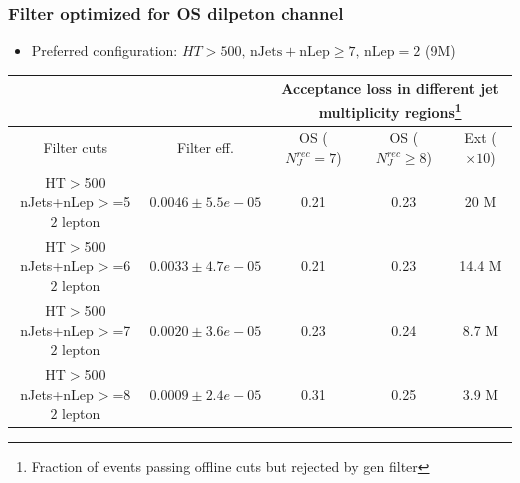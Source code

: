 \documentclass{beamer}
\begin{document}
\begin{frame}
\frametitle{Filter optimized for OS dilpeton channel}
\begin{itemize}
\item{\footnotesize  Preferred configuration: $HT>500,\, \mathrm{nJets+nLep}\geq7,\,  \mathrm{nLep}=2$ (9M)}
\end{itemize}
\begin{center}
{\tiny \begin{tabular}{|c|c|c|c|c|}
            \cline{1-5}
             & & \multicolumn{3}{|c|}{Acceptance loss in different jet multiplicity regions\footnote{Fraction of events passing offline cuts but rejected by gen filter}}\\
            \cline{1-5}
\hline Filter cuts      & Filter eff.   & OS  ($N_J^{rec}=7$)& OS ($N_J^{rec}\geq8$)&  Ext ($\times 10$) \\
\hline \thead{HT$>$500 \\  nJets+nLep$>$=5 \\  $2$ lepton} & $0.0046 \pm 5.5e-05$  & 0.21 & 0.23 & 20 M\\
\hline \thead{HT$>$500 \\  nJets+nLep$>$=6 \\  $2$ lepton} & $0.0033 \pm 4.7e-05$  & 0.21 & 0.23 & 14.4 M\\
\hline \rowcolor{lightgray} \thead{HT$>$500 \\  nJets+nLep$>$=7 \\  $2$ lepton} & $0.0020 \pm 3.6e-05$  & 0.23 & 0.24 & 8.7 M\\
\hline \thead{HT$>$500 \\  nJets+nLep$>$=8 \\  $2$ lepton} & $0.0009 \pm 2.4e-05$  & 0.31 & 0.25 & 3.9 M\\
\hline
\end{tabular} }
\end{center}

\end{frame}

\end{document}
